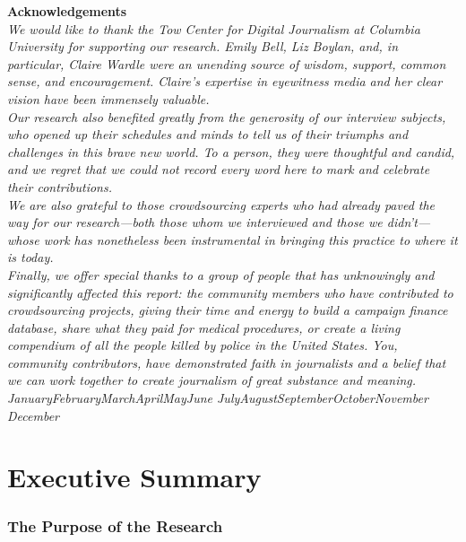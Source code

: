 \documentclass[notoc, symmetric, nobib, nols]{towcenter-guideto-book}
\newcommand{\monthyear}{%
  \ifcase\month\or January\or February\or March\or April\or May\or June\or
  July\or August\or September\or October\or November\or
  December\fi\space\number\year
}
\newcommand{\blankpage}{\newpage\hbox{}\thispagestyle{empty}\newpage}
\begin{document}
\blankpage
\blankpage


\null
\begin{fullwidth}
\noindent\textsf{\textbf{Acknowledgements}} \\[0.3cm]
\noindent\textit{We would like to thank the Tow Center for Digital Journalism at Columbia University for supporting our research. Emily Bell, Liz Boylan, and, in particular, Claire Wardle were an unending source of wisdom, support, common sense, and encouragement. Claire’s expertise in eyewitness media and her clear vision have been immensely valuable.  
}\\[0.1cm]\noindent\textit{
Our research also benefited greatly from the generosity of our interview subjects, who opened up their schedules and minds to tell us of their triumphs and challenges in this brave new world. To a person, they were thoughtful and candid, and we regret that we could not record every word here to mark and celebrate their contributions.  
}\\[0.1cm]\noindent\textit{
We are also grateful to those crowdsourcing experts who had already paved the way for our research---both those whom we interviewed and those we didn’t---whose work has nonetheless been instrumental in bringing this practice to where it is today.  
}\\[0.1cm]\noindent\textit{
Finally, we offer special thanks to a group of people that has unknowingly and significantly affected this report: the community members who have contributed to crowdsourcing projects, giving their time and energy to build a campaign finance database, share what they paid for medical procedures, or create a living compendium of all the people killed by police in the United States. You, community contributors, have demonstrated faith in journalists and a belief that we can work together to create journalism of great substance and meaning.
}\\[0.1cm]
\noindent\textit{\monthyear}
\end{fullwidth}
\tableofcontents


\cleardoublepage


\mainmatter


\chapter{Executive Summary} 


\subsection{The Purpose of the Research}
\end{document}
